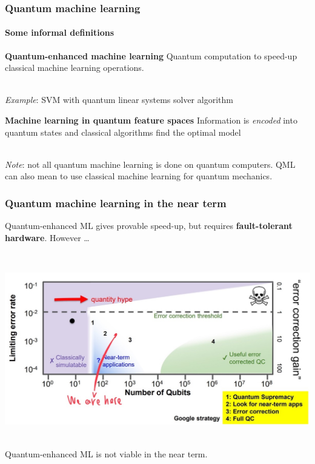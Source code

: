 \documentclass{beamer}
\begin{document}
\begin{frame}
    \frametitle{Quantum machine learning}
    \framesubtitle{Some informal definitions}

    \begin{block}{\textbf{Quantum-enhanced machine learning}}
        Quantum computation to speed-up classical machine learning operations.

        \ \\
        \emph{Example}: SVM with quantum linear systems solver algorithm
    \end{block}

    \begin{block}{\textbf{Machine learning in quantum feature spaces}}
        Information is \emph{encoded} into quantum states and classical algorithms find the optimal model
    \end{block}

    \ \\
    \pause
    \footnotesize
    \emph{Note}: not all quantum machine learning is done on quantum computers. QML can also mean to use classical machine learning for quantum mechanics.


\end{frame}

\begin{frame}
    \frametitle{Quantum machine learning in the near term}

    Quantum-enhanced ML gives provable speed-up, but requires \textbf{fault-tolerant hardware}. However \dots

    \ \\
    \pause
    \begin{minipage}{\textwidth}
        \centering
        \includegraphics[width=.7\textwidth]{pics/google-quality-quantity-chart-here.jpeg}

        
        \ \\
        \color{red} Quantum-enhanced ML is not viable in the near term.
      \end{minipage}


\end{frame}
\end{document}
